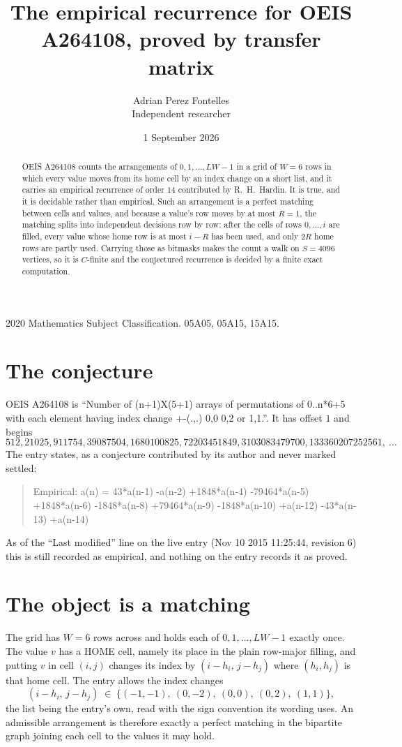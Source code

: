 \documentclass[11pt,a4paper]{article}
\title{The empirical recurrence for OEIS A264108, proved by transfer matrix}
\author{Adrian Perez Fontelles\\ \small Independent researcher}
\date{1 September 2026}
\theoremstyle{plain}
\theoremstyle{definition}
\begin{document}
\maketitle

\begin{abstract}
OEIS A264108 counts the arrangements of $0,1,\dots,LW-1$ in a grid of $W=6$ rows in which
every value moves from its home cell by an index change on a short list, and it carries an
empirical recurrence of order $14$ contributed by R.~H.~Hardin. It is true, and it is
decidable rather than empirical. Such an arrangement is a perfect matching between cells and
values, and because a value's row moves by at most $R=1$, the matching splits into
independent decisions row by row: after the cells of rows $0,\dots,i$ are filled,
every value whose home row is at most $i-R$ has been used, and only $2R$ home rows are
partly used. Carrying those as bitmasks makes the count a walk on $S=4096$ vertices, so it is
$C$-finite and the conjectured recurrence is decided by a finite exact computation.
\end{abstract}

\noindent\small 2020 Mathematics Subject Classification. 05A05, 05A15, 15A15.\normalsize

\section{The conjecture}

OEIS A264108 is ``Number of (n+1)X(5+1) arrays of permutations of 0..n*6+5 with each element having index change +-(.,.) 0,0 0,2 or 1,1.''. It has offset $1$ and begins
\[
512, 21025, 911754, 39087504, 1680100825, 72203451849, 3103083479700, 133360207252561,\ \dots
\]
The entry states, as a conjecture contributed by its author and never marked settled:
\begin{quote}
Empirical: a(n) = 43*a(n-1) -a(n-2) +1848*a(n-4) -79464*a(n-5) +1848*a(n-6) -1848*a(n-8) +79464*a(n-9) -1848*a(n-10) +a(n-12) -43*a(n-13) +a(n-14)
\end{quote}
As of the ``Last modified'' line on the live entry (Nov 10 2015 11:25:44, revision 6) this is still
recorded as empirical, and nothing on the entry records it as proved.

\section{The object is a matching}

The grid has $W=6$ rows across and holds each of $0,1,\dots,LW-1$ exactly once. The value
$v$ has a HOME cell, namely its place in the plain row-major filling, and putting $v$ in cell
$(i,j)$ changes its index by $(i-h_i,\,j-h_j)$ where $(h_i,h_j)$ is that home cell. The entry
allows the index changes
\[
(i-h_i,\,j-h_j)\;\in\;\{(-1,-1),\ (0,-2),\ (0,0),\ (0,2),\ (1,1)\},
\]
the list being the entry's own, read with the sign convention its wording uses. An admissible
arrangement is therefore exactly a perfect matching in the bipartite graph joining each cell to
the values it may hold.
\end{document}
